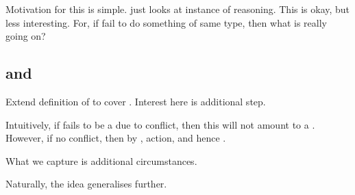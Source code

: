 \begin{note}
  Motivation for this is simple.
  \tR{} just looks at instance of reasoning.
  This is okay, but less interesting.
  For, if fail to do something of same type, then what is really going on?
\end{note}

\subsection{ and }
\label{sec:fc3}

\begin{note}
  Extend definition of \tC{} to cover .
  Interest here is additional step.

  Intuitively, if fails to be a \fc{} due to conflict, then this will not amount to a \tRep{}.
  However, if no conflict, then by \fc{}, action, and hence \tRep{}.

  What we capture is additional circumstances.

  Naturally, the idea generalises further.
\end{note}

